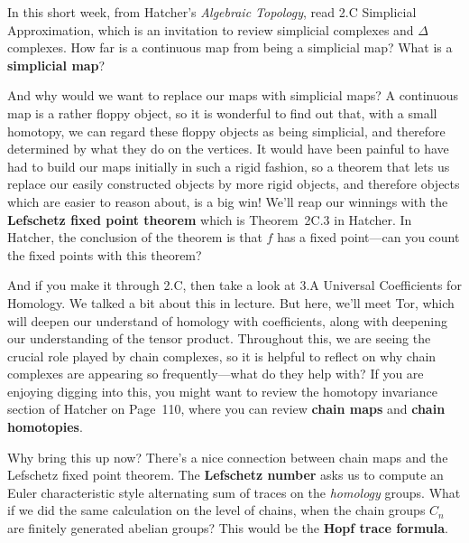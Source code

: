 \documentclass{homework}
\author{Jim Fowler}
\date{Week 3: Simplices}
\begin{document}
\maketitle

In this short week, from Hatcher's \textit{Algebraic Topology}, read
\textsection 2.C Simplicial Approximation, which is an invitation to
review simplicial complexes and $\Delta$ complexes.  How far is a
continuous map from being a simplicial map?  What is a
\textbf{simplicial map}?

And why would we want to replace our maps with simplicial maps?  A
continuous map is a rather floppy object, so it is wonderful to find
out that, with a small homotopy, we can regard these floppy objects as
being simplicial, and therefore determined by what they do on the
vertices.  It would have been painful to have had to build our maps
initially in such a rigid fashion, so a theorem that lets us replace
our easily constructed objects by more rigid objects, and therefore
objects which are easier to reason about, is a big win!  We'll reap
our winnings with the \textbf{Lefschetz fixed point theorem} which is
Theorem~2C.3 in Hatcher.  In Hatcher, the conclusion of the theorem is
that $f$ has a fixed point---can you count the fixed points with this
theorem?

And if you make it through \textsection 2.C, then take a look at 3.A
Universal Coefficients for Homology.  We talked a bit about this in
lecture. But here, we'll meet Tor, which will deepen our understand of
homology with coefficients, along with deepening our understanding of
the tensor product.  Throughout this, we are seeing the crucial role
played by chain complexes, so it is helpful to reflect on why chain
complexes are appearing so frequently---what do they help with?  If
you are enjoying digging into this, you might want to review the
homotopy invariance section of Hatcher on Page~110, where you can
review \textbf{chain maps} and \textbf{chain homotopies}.

Why bring this up now?  There's a nice connection between chain maps
and the Lefschetz fixed point theorem.  The \textbf{Lefschetz number}
asks us to compute an Euler characteristic style alternating sum of
traces on the \textit{homology} groups.  What if we did the same
calculation on the level of chains, when the chain groups $C_n$ are
finitely generated abelian groups?  This would be the \textbf{Hopf
trace formula}.
\end{document}
